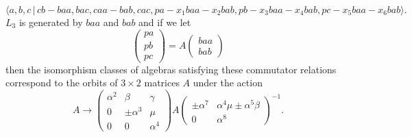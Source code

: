 \documentclass[10pt,thmsa]{article}
\begin{document}
\[
\langle
a,b,c\,|%
\,cb-baa,bac,caa-bab,cac,pa-x_{1}baa-x_{2}bab,pb-x_{3}baa-x_{4}bab,pc-x_{5}baa-x_{6}bab\rangle . 
\]%
$L_{3}$ is generated by $baa$ and $bab$ and if we let 
\[
\left( 
\begin{array}{l}
pa \\ 
pb \\ 
pc%
\end{array}%
\right) =A\left( 
\begin{array}{l}
baa \\ 
bab%
\end{array}%
\right) 
\]%
then the isomorphism classes of algebras satisfying these commutator
relations correspond to the orbits of $3\times 2$ matrices $A$ under the
action 
\[
A\rightarrow \left( 
\begin{array}{lll}
\alpha ^{2} & \beta & \gamma \\ 
0 & \pm \alpha ^{3} & \mu \\ 
0 & 0 & \alpha ^{4}%
\end{array}%
\right) A\left( 
\begin{array}{ll}
\pm \alpha ^{7} & \alpha ^{4}\mu \pm \alpha ^{5}\beta \\ 
0 & \alpha ^{8}%
\end{array}%
\right) ^{-1}. 
\]
\end{document}
